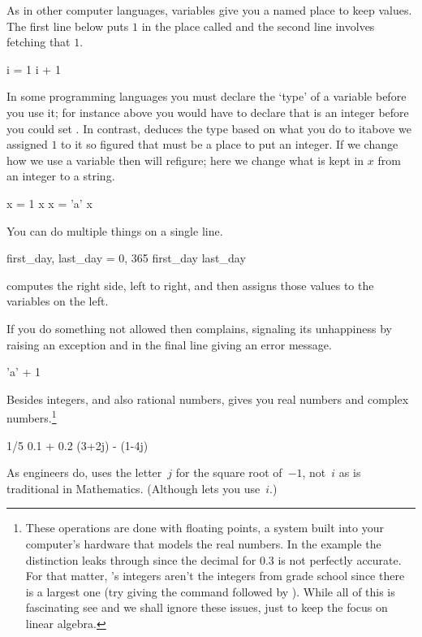 As in other computer languages, 
variables give you a named place to keep values.
The first line below puts $1$ in the place called 
and the second line involves fetching that $1$.
\begin{pythonconsole}
i = 1
i + 1
\end{pythonconsole}
In some programming languages you must declare the `type' of a variable
before you use it; for instance above you would have to declare 
that  is an integer before you could set .
In contrast, \python{} deduces the type 
based on what you do to it\Dash above we assigned $1$ to it
so \python{} figured that  must be a place to put an integer.
If we change how we use a variable then \python{} will 
refigure; here we change what is kept in $x$ from an integer to a string.
\begin{pythonconsole}
x = 1
x
x = 'a'
x
\end{pythonconsole}

You can do multiple things on a single line.
\begin{pythonconsole}
first_day, last_day = 0, 365
first_day
last_day   
\end{pythonconsole}
\python{} computes the right side, left to right, and then assigns 
those values to the variables on the left.

If you do something not allowed then 
\python{} complains, signaling its unhappiness by 
raising an exception and in the final line giving an error 
message.
\begin{pythonconsole}
'a' + 1
\end{pythonconsole}

Besides integers, and also rational numbers, 
\python{} gives you real numbers and complex numbers.\footnote{%
  These operations
  are done with floating points, a system 
  built into your computer's hardware that
  models the real numbers.
  In the example the distinction leaks through
  since the decimal for $0.3$ is not perfectly accurate.
  For that matter, \protect\python's integers aren't the integers  
  from grade school since there is a largest one 
  (try giving \python{} the 
  command \protect{} followed by 
  \protect{}). 
  While all of this is fascinating\protect\Dash
  see \protect\cite{PythonTeam19a} and \protect\cite{Goldberg91}\protect\Dash
  we shall ignore these issues, just to keep the focus on 
  linear algebra.}
\begin{pythonconsole}
1/5
0.1 + 0.2
(3+2j) - (1-4j)
\end{pythonconsole}
As engineers do, \python{} uses the letter~$j$ for the square
root of~$-1$, not~$i$ as is traditional in Mathematics.
(Although \protect\Sage{} lets you use~$i$.)

